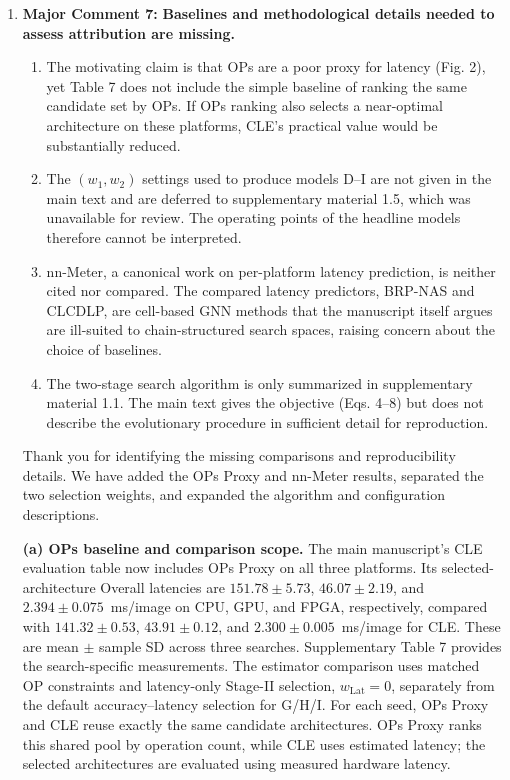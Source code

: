 \documentclass[11pt]{article}
\newcommand{\response}[1]{%
  \Needspace{3\baselineskip}%
  \par\noindent{\color{responseblue}\textbf{Response to #1:}}\par
  \vspace{1mm}\color{responseblue}}
\begin{document}
\begin{enumerate}[leftmargin=0pt,label={},itemsep=5mm]
\item[]\textbf{Major Comment 7:} \textbf{Baselines and methodological details needed to assess attribution are missing.}
\begin{enumerate}[label=(\alph*),leftmargin=2em,itemsep=2mm]
  \item The motivating claim is that OPs are a poor proxy for latency (Fig. 2), yet Table 7 does not include the simple baseline of ranking the same candidate set by OPs. If OPs ranking also selects a near-optimal architecture on these platforms, CLE's practical value would be substantially reduced.
  \item The $(w_1,w_2)$ settings used to produce models D--I are not given in the main text and are deferred to supplementary material 1.5, which was unavailable for review. The operating points of the headline models therefore cannot be interpreted.
  \item nn-Meter, a canonical work on per-platform latency prediction, is neither cited nor compared. The compared latency predictors, BRP-NAS and CLCDLP, are cell-based GNN methods that the manuscript itself argues are ill-suited to chain-structured search spaces, raising concern about the choice of baselines.
  \item The two-stage search algorithm is only summarized in supplementary material 1.1. The main text gives the objective (Eqs. 4--8) but does not describe the evolutionary procedure in sufficient detail for reproduction.
\end{enumerate}
\response{Major Comment 7}
\begingroup
\normalfont\color{responseblue}
Thank you for identifying the missing comparisons and reproducibility details. We have added the OPs Proxy and nn-Meter results, separated the two selection weights, and expanded the algorithm and configuration descriptions.

\textbf{(a) OPs baseline and comparison scope.} The main manuscript's CLE evaluation table now includes OPs Proxy on all three platforms. Its selected-architecture Overall latencies are $151.78\pm5.73$, $46.07\pm2.19$, and $2.394\pm0.075$~ms/image on CPU, GPU, and FPGA, respectively, compared with $141.32\pm0.53$, $43.91\pm0.12$, and $2.300\pm0.005$~ms/image for CLE. These are mean $\pm$ sample SD across three searches. Supplementary Table 7 provides the search-specific measurements. The estimator comparison uses matched OP constraints and latency-only Stage-II selection, $w_{\mathrm{Lat}}=0$, separately from the default accuracy--latency selection for G/H/I. For each seed, OPs Proxy and CLE reuse exactly the same candidate architectures. OPs Proxy ranks this shared pool by operation count, while CLE uses estimated latency; the selected architectures are evaluated using measured hardware latency.


\end{enumerate}
\end{document}
